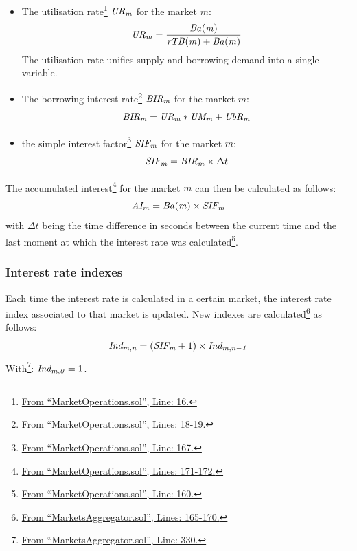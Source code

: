 \begin{itemize}
  \item The utilisation rate\footnote{\href{https://github.com/SVOIcom/everscalend-contracts/blob/8d24e268f9c44bd3e896fb6a28bbf8a42c7027a9/smart-contracts/src/Market/libraries/MarketOperations.sol\#L16}{From ``MarketOperations.sol'', Line: 16.}} $\mathit{UR_{m}}$ for the market $m$:
  $$
    \mathit{UR_{m}} = \frac{ \mathit{Ba(m)} }{ \mathit{rTB(m)} + \mathit{Ba(m)} }
  $$
  The utilisation rate unifies supply and borrowing demand into a single variable.
  \item The borrowing interest rate\footnote{\href{https://github.com/SVOIcom/everscalend-contracts/blob/8d24e268f9c44bd3e896fb6a28bbf8a42c7027a9/smart-contracts/src/Market/libraries/MarketOperations.sol\#L18-L19}{From ``MarketOperations.sol'', Lines: 18-19.}} $\mathit{BIR_{m}}$ for the market $m$:
  $$
    \mathit{BIR_{m}} = \mathit{UR_{m}} * \mathit{UM_{m}} + \mathit{UbR_{m}}
  $$ %
  \item the simple interest factor\footnote{\href{https://github.comdev/SVOIcom/everscalend-contracts/blob/8d24e268f9c44bd3e896fb6a28bbf8a42c7027a9/smart-contracts/src/Market/MarketsAggregator.sol\#L167}{From ``MarketOperations.sol'', Line: 167.}} $\mathit{SIF_{m}}$ for the market $m$:
  $$
    \mathit{SIF_{m}} = \mathit{BIR_{m}} \times \Delta t
  $$
\end{itemize}
The accumulated interest\footnote{\href{https://github.com/SVOIcom/everscalend-contracts/blob/8d24e268f9c44bd3e896fb6a28bbf8a42c7027a9/smart-contracts/src/Market/MarketsAggregator.sol\#L171-L172}{From ``MarketOperations.sol'', Lines: 171-172.}} for the market $m$ can then be calculated as follows:
$$
  \mathit{AI_{m}} = \mathit{Ba(m)} \times \mathit{SIF_{m}}
$$ %
with $\Delta t$ being the time difference in seconds between the current time and the last moment at which the interest rate was calculated\footnote{\href{https://github.com/SVOIcom/everscalend-contracts/blob/8d24e268f9c44bd3e896fb6a28bbf8a42c7027a9/smart-contracts/src/Market/MarketsAggregator.sol\#L160}{From ``MarketOperations.sol'', Line: 160.}}.

\subsubsection{Interest rate indexes}

Each time the interest rate is calculated in a certain market, the interest rate index associated to that market is updated. New indexes are calculated\footnote{\href{https://github.com/SVOIcom/everscalend-contracts/blob/8d24e268f9c44bd3e896fb6a28bbf8a42c7027a9/smart-contracts/src/Market/MarketsAggregator.sol\#L165-L170}{From ``MarketsAggregator.sol'', Lines: 165-170.}} as follows:
$$
\mathit{Ind_{m, n}} = (\mathit{SIF_{m}} + 1) \times\mathit{Ind_{m, n-1}}
$$
With\footnote{\href{https://github.com/SVOIcom/everscalend-contracts/blob/8d24e268f9c44bd3e896fb6a28bbf8a42c7027a9/smart-contracts/src/Market/MarketsAggregator.sol\#L330}{From ``MarketsAggregator.sol'', Line: 330.}}: $\mathit{Ind_{m, 0}} = 1$.

